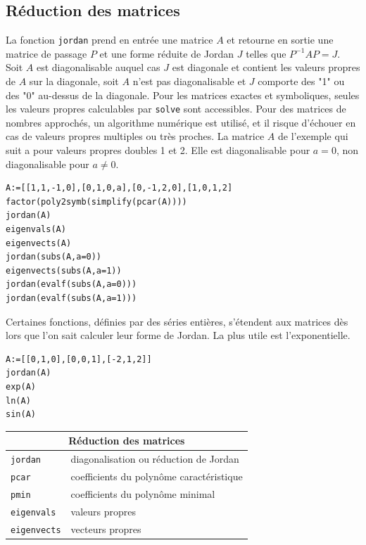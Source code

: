 \documentclass{article}
\begin{document}
\subsection{R\'eduction des matrices}
%
La fonction \verb|jordan| prend en entr\'ee une matrice $A$ et retourne en
sortie une matrice de passage $P$ et une forme r\'eduite de Jordan $J$ telles
que $P^{-1}A P=J$. Soit $A$ est diagonalisable auquel cas $J$ est
diagonale et contient les valeurs propres de $A$ sur la diagonale,
soit $A$ n'est pas diagonalisable et $J$ comporte des "1" ou des "0"
au-dessus de la diagonale. Pour les matrices exactes et symboliques,
seules les valeurs propres calculables par
\verb|solve| sont accessibles. Pour des matrices de nombres approch\'es,
un algorithme num\'erique est utilis\'e, et il risque
d'\'echouer en cas de valeurs propres multiples ou tr\`es proches.
La matrice $A$ de l'exemple qui suit a pour valeurs propres doubles 1
et 2. Elle est diagonalisable pour
$a=0$, non diagonalisable pour $a\neq 0$.
\begin{verbatim}
A:=[[1,1,-1,0],[0,1,0,a],[0,-1,2,0],[1,0,1,2]
factor(poly2symb(simplify(pcar(A))))
jordan(A)
eigenvals(A)
eigenvects(A)
jordan(subs(A,a=0))
eigenvects(subs(A,a=1))
jordan(evalf(subs(A,a=0)))
jordan(evalf(subs(A,a=1)))
\end{verbatim}
Certaines fonctions, d\'efinies par des s\'eries
enti\`eres, s'\'etendent aux matrices d\`es lors que l'on sait calculer
leur forme de Jordan. La plus utile est l'exponentielle.
\begin{verbatim}
A:=[[0,1,0],[0,0,1],[-2,1,2]]
jordan(A)
exp(A)
ln(A)
sin(A)
\end{verbatim}
 
\begin{center}
\begin{tabular}{|ll|}
\hline
\multicolumn{2}{|c|}{\bf R\'eduction des matrices}\\
\hline\hline
\verb|jordan| & diagonalisation ou r\'eduction de Jordan\\
\verb|pcar| & coefficients du polyn\^ome caract\'eristique\\
\verb|pmin| & coefficients du polyn\^ome minimal\\
\verb|eigenvals| & valeurs propres\\
\verb|eigenvects| & vecteurs propres\\
\hline
\end{tabular}
\end{center}
%
\end{document}
